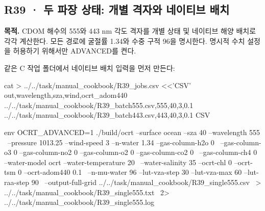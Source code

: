\clearpage

\subsection{R39 · 두 파장 상태: 개별 격자와 네이티브 배치}
\label{sec:auto:09_cookbook:6.2}

\label{recipe:R39}

\textbf{목적. }CDOM 해수의 555와 443 nm 각도 격자를 개별 상태 및 네이티브 해양 배치로 각각 계산한다. 모든 경로에 굴절률 1.34와 수중 구적 96을 명시한다. 명시적 수치 설정을 허용하기 위해서만 ADVANCED를 켠다.

같은 C 작업 폴더에서 네이티브 배치 입력을 먼저 만든다:

\noindent\begin{minipage}{\linewidth}
\begin{ManualCode}

cat > ../../task/manual_cookbook/R39_jobs.csv <<'CSV'
out,wavelength,sza,wind,ocrt_adom440
../../task/manual_cookbook/R39_batch555.csv,555,40,3,0.1
../../task/manual_cookbook/R39_batch443.csv,443,40,3,0.1
CSV

\end{ManualCode}
\end{minipage}\par

\noindent\begin{minipage}{\linewidth}
\begin{ManualCode}

env OCRT_ADVANCED=1 ./build/ocrt --surface ocean --sza 40 --wavelength 555 \
  --pressure 1013.25 --wind-speed 3 --n-water 1.34 --gas-column-h2o 0 \
  --gas-column-o3 0 --gas-column-no2 0 --gas-column-o2 0 --gas-column-co2 0 \
  --gas-column-ch4 0 --water-model ocrt --water-temperature 20 \
  --water-salinity 35 --ocrt-chl 0 --ocrt-tsm 0 --ocrt-adom440 0.1 \
  --n-mu-water 96 --lut-vza-step 30 --lut-vza-max 60 --lut-raa-step 90 \
  --output-full-grid ../../task/manual_cookbook/R39_single555.csv \
  > ../../task/manual_cookbook/R39_single555.txt \
  2> ../../task/manual_cookbook/R39_single555.log

\end{ManualCode}
\end{minipage}\par

